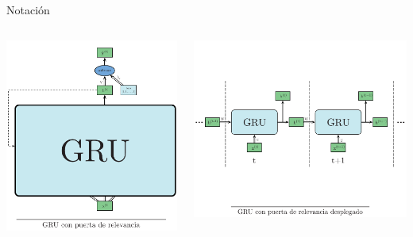 \documentclass[aspectratio=169]{beamer}
\begin{document}
\begin{frame}{Notación}
	\begin{columns}
		\begin{column}{0.4\textwidth}
			\includegraphics[width=\textwidth, center]{imgs/tema4/rnn/GRUrele2.pdf}
		\end{column}

		\begin{column}{0.6\textwidth}
			\includegraphics[width=.9\textwidth, center]{imgs/tema4/rnn/GRUrele2desp.pdf}
		\end{column}
	\end{columns}
\end{frame}
\end{document}
